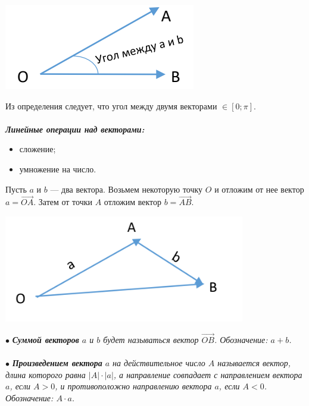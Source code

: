 \begin{center}
	\includegraphics[scale=0.4]{images/cornAB.png}
\end{center}
Из определения следует, что угол между двумя векторами $\in [0; \pi]$.\\\\
\textbf{\textit{Линейные операции над векторами:}}\begin{itemize}
	\item сложение;
	\item умножение на число.
\end{itemize}
Пусть $a$ и $b$ --- два вектора. Возьмем некоторую точку $O$ и отложим от нее вектор $a = \overrightarrow{OA}$. Затем от точки $A$ отложим вектор $b = \overrightarrow{AB}$.
\begin{center}
	\includegraphics[scale=0.4]{images/vectriangle.png}
\end{center}
$\bullet$ \textit{\textbf{Суммой векторов} $a$ и $b$ будет называться вектор $\overrightarrow{OB}$. Обозначение: $a+b$.}\\\\
$\bullet$ \textit{\textbf{Произведением вектора} $a$ на действительное число $A$ называется вектор, длина которого равна $|A|\cdot |a|$, а направление совпадает с направлением вектора $a$, если $A>0$, и противоположно направлению вектора $a$, если $A<0$. Обозначение: $A\cdot a$. }\\\\
